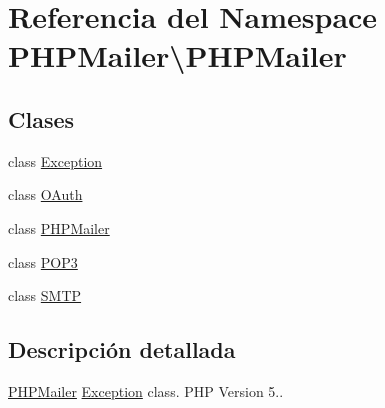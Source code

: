 \hypertarget{namespacePHPMailer_1_1PHPMailer}{}\section{Referencia del Namespace P\+H\+P\+Mailer\textbackslash{}P\+H\+P\+Mailer}
\label{namespacePHPMailer_1_1PHPMailer}
\subsection*{Clases}
\begin{DoxyCompactItemize}
\item 
class \hyperlink{classPHPMailer_1_1PHPMailer_1_1Exception}{Exception}
\item 
class \hyperlink{classPHPMailer_1_1PHPMailer_1_1OAuth}{O\+Auth}
\item 
class \hyperlink{classPHPMailer_1_1PHPMailer_1_1PHPMailer}{P\+H\+P\+Mailer}
\item 
class \hyperlink{classPHPMailer_1_1PHPMailer_1_1POP3}{P\+O\+P3}
\item 
class \hyperlink{classPHPMailer_1_1PHPMailer_1_1SMTP}{S\+M\+TP}
\end{DoxyCompactItemize}


\subsection{Descripción detallada}
\hyperlink{classPHPMailer_1_1PHPMailer_1_1PHPMailer}{P\+H\+P\+Mailer} \hyperlink{classPHPMailer_1_1PHPMailer_1_1Exception}{Exception} class. P\+HP Version 5..

